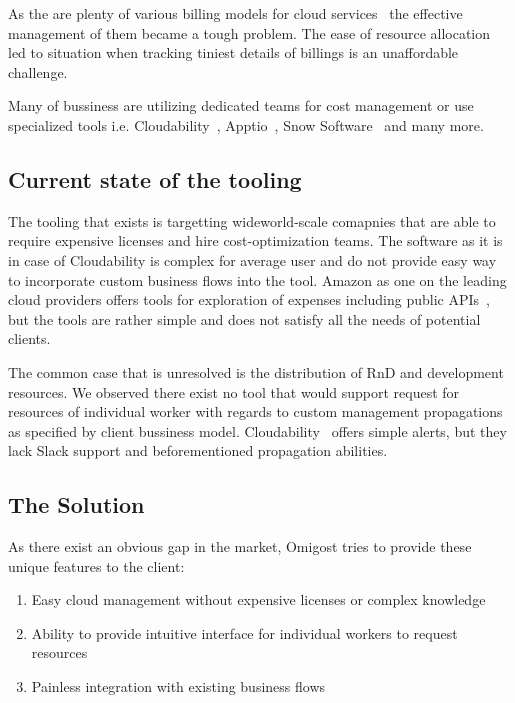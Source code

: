\documentclass[licencjacka,en]{thesisclass}
\begin{document}
As the are plenty of various billing models for cloud services~\cite{GLaatikainen}
the effective management of them became a tough problem.
The ease of resource allocation led to situation when tracking tiniest details of billings is an unaffordable challenge.

Many of bussiness are utilizing dedicated teams for cost management or use specialized tools i.e.
Cloudability~\cite{Cloudability}, Apptio~\cite{Aptio}, Snow Software~\cite{SnowSoftware} and many more.

\subsection{Current state of the tooling}

The tooling that exists is targetting wideworld-scale comapnies that are able to require expensive licenses and hire cost-optimization teams.
The software as it is in case of Cloudability is complex for average user and do not provide easy way to incorporate custom business flows into the tool.
Amazon as one on the leading cloud providers offers tools for exploration of expenses including public APIs~\cite{AWSCostManagement},
but the tools are rather simple and does not satisfy all the needs of potential clients.

The common case that is unresolved is the distribution of RnD and development resources.
We observed there exist no tool that would support request for resources of individual worker with regards to custom management propagations as specified by client bussiness model.
Cloudability~\cite{CloudabilityAlerts} offers simple alerts, but they lack Slack support and beforementioned propagation abilities.

\subsection{The Solution}

As there exist an obvious gap in the market, Omigost tries to provide these unique features to the client:

\begin{enumerate}
    \item Easy cloud management without expensive licenses or complex knowledge
    \item Ability to provide intuitive interface for individual workers to request resources
    \item Painless integration with existing business flows
\end{enumerate}
\end{document}
